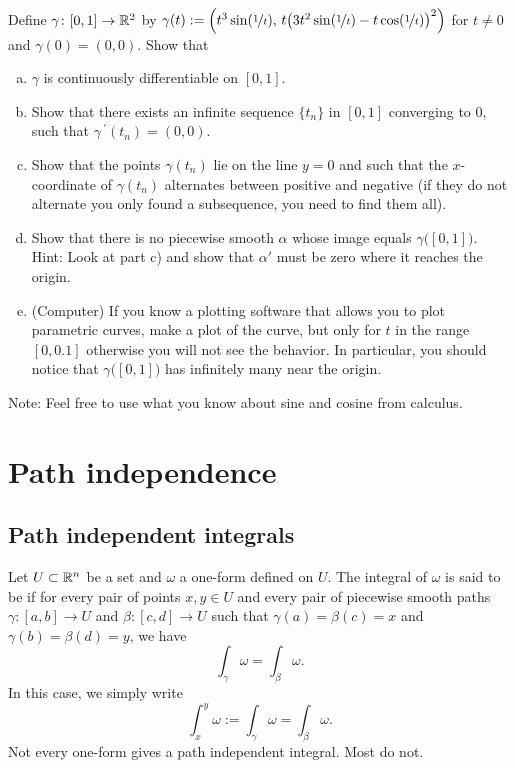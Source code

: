 \begin{exercise}
Define $\gamma \colon [0,1] \to {\mathbb{R}}^2$ by
$\gamma(t) := \Bigl( t^3 \sin(\nicefrac{1}{t}),\,
t{\bigl(3t^2\sin(\nicefrac{1}{t})-t\cos(\nicefrac{1}{t})\bigr)}^2 \Bigr)$
for
$t \not= 0$ and $\gamma(0) = (0,0)$.  Show that
\begin{enumerate}[a)]
\item
$\gamma$ is continuously differentiable on $[0,1]$.
\item
Show that there exists an infinite sequence $\{ t_n \}$ in $[0,1]$
converging to 0, such that
$\gamma^{\:\prime}(t_n) = (0,0)$.
\item
Show that the points $\gamma(t_n)$ lie on the line $y=0$ and such
that the $x$-coordinate of $\gamma(t_n)$ alternates between positive and
negative (if they do not alternate you only found a subsequence,
you need to find them all).
\item
Show that there is no piecewise smooth $\alpha$ whose image equals
$\gamma\bigl([0,1]\bigr)$.  Hint: Look at part c) and show that $\alpha'$
must be zero where it reaches the origin.
\item
(Computer) If you know a plotting software that allows you to plot
parametric curves, make a plot of the curve, but only for $t$ in the
range $[0,0.1]$ otherwise you will not see the behavior.  In particular, you
should notice that $\gamma\bigl([0,1]\bigr)$ has infinitely many
near the origin.
\end{enumerate}
Note: Feel free to use what you know about sine and cosine from calculus.
\end{exercise}


\sectionnewpage
\section{Path independence}
\label{sec:pathind}


\subsection{Path independent integrals}

Let $U \subset {\mathbb{R}}^n$ be a set and $\omega$ a one-form defined on $U$.
The integral of $\omega$
is said to be \emph{}
if for every pair of points $x,y \in U$ and
every pair of piecewise smooth paths
$\gamma \colon [a,b] \to U$ and
$\beta \colon [c,d] \to U$ such that $\gamma(a) = \beta(c) = x$
and $\gamma(b) = \beta(d) = y$, we have
\begin{equation*}
\int_\gamma \omega = \int_\beta \omega .
\end{equation*}
In this case, we simply write
\begin{equation*}
\int_x^y \omega := \int_\gamma \omega = \int_\beta \omega .
\end{equation*}
Not every one-form gives a path independent integral.  Most do not.

